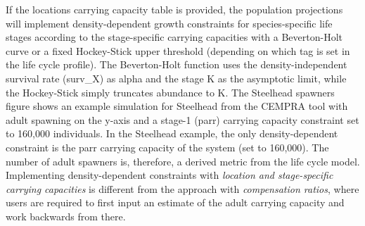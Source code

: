\documentclass[
  letterpaper,
  DIV=11,
  numbers=noendperiod]{scrreprt}
\begin{document}
If the locations carrying capacity table is provided, the population
projections will implement density-dependent growth constraints for
species-specific life stages according to the stage-specific carrying
capacities with a Beverton-Holt curve or a fixed Hockey-Stick upper
threshold (depending on which tag is set in the life cycle profile). The
Beverton-Holt function uses the density-independent survival rate
(surv\_X) as alpha and the stage K as the asymptotic limit, while the
Hockey-Stick simply truncates abundance to K. The Steelhead spawners
figure shows an example simulation for Steelhead from the CEMPRA tool
with adult spawning on the y-axis and a stage-1 (parr) carrying capacity
constraint set to 160,000 individuals. In the Steelhead example, the
only density-dependent constraint is the parr carrying capacity of the
system (set to 160,000). The number of adult spawners is, therefore, a
derived metric from the life cycle model. Implementing density-dependent
constraints with \emph{location and stage-specific carrying capacities}
is different from the approach with \emph{compensation ratios}, where
users are required to first input an estimate of the adult carrying
capacity and work backwards from there.
\end{document}
